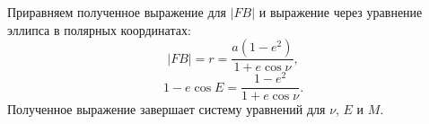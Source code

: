 Приравняем полученное выражение для $|FB|$ и выражение через уравнение эллипса в полярных координатах:
\begin{equation*}
	|FB| = r = \frac{a \left(1 - e^2 \right)}{ 1 + e \cos \nu},
\end{equation*}
\begin{equation*}
	1 - e \cos E  = \frac{1 - e^2}{ 1 + e \cos \nu}.
\end{equation*}
Полученное выражение завершает систему уравнений для $\nu$, $E$ и $M$.

